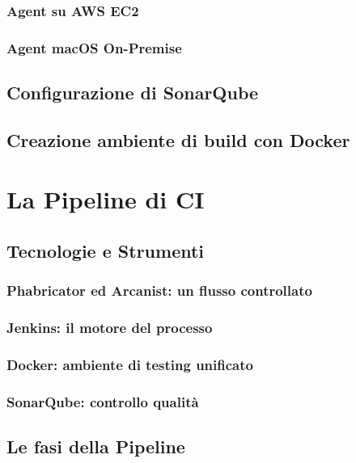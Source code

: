 \documentclass[a4paper,12pt]{report}
\begin{document}
	\subsection{Agent su AWS EC2}
	
	\subsection{Agent macOS On-Premise}
	
	\section{Configurazione di SonarQube}
	
	\section{Creazione ambiente di build con Docker}
	
	\chapter{La Pipeline di CI}
	
	\section{Tecnologie e Strumenti}
	
	\subsection{Phabricator ed Arcanist: un flusso controllato}
	
	\subsection{Jenkins: il motore del processo}
	
	\subsection{Docker: ambiente di testing unificato}
	
	\subsection{SonarQube: controllo qualità}
	
	\section{Le fasi della Pipeline}
	
\end{document}
